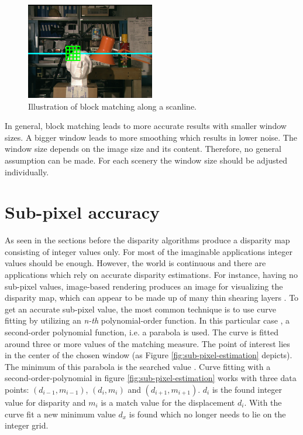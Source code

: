 \begin{figure}[h!]
  \centering
  \includegraphics[width=0.5\textwidth]{src/images/tsukuba-block.png}
  \caption{Illustration of block matching along a scanline.}
  \label{fig:tsukuba-block}
\end{figure}

\noindent In general, block matching leads to more accurate results with smaller window sizes.
A bigger window leads to more smoothing which results in lower noise.
The window size depends on the image size and its content.
Therefore, no general assumption can be made.
For each scenery the window size should be adjusted individually.

\section{Sub-pixel accuracy}

As seen in the sections before the disparity algorithms produce a disparity map consisting of integer values only.
For most of the imaginable applications integer values should be enough.
However, the world is continuous and there are applications which rely on accurate disparity estimations.
For instance, having no sub-pixel values, image-based rendering produces an image for visualizing the disparity map, which can appear to be made up of many thin shearing layers \citep{scharstein2002taxonomy}.
To get an accurate sub-pixel value, the most common technique is to use curve fitting by utilizing an \textit{n-th} polynomial-order function.
In this particular case \citep{scharstein2002taxonomy}, a second-order polynomial function, i.e. a parabola is used.
The curve is fitted around three or more values of the matching measure.
The point of interest lies in the center of the chosen window (as Figure \ref{fig:sub-pixel-estimation} depicts).
The minimum of this parabola is the searched value \citep{cyganek2011introduction, scharstein2014high}.
\newline\newline\noindent Curve fitting with a second-order-polynomial in figure \ref{fig:sub-pixel-estimation} works with three data points: $(d_{i-1}, m_{i-1})$, $(d_{i}, m_{i})$ and $(d_{i+1}, m_{i+1})$.
$d_i$ is the found integer value for disparity and $m_i$ is a match value for the displacement $d_i$.
With the curve fit a new minimum value $d_x$ is found which no longer needs to lie on the integer grid.

